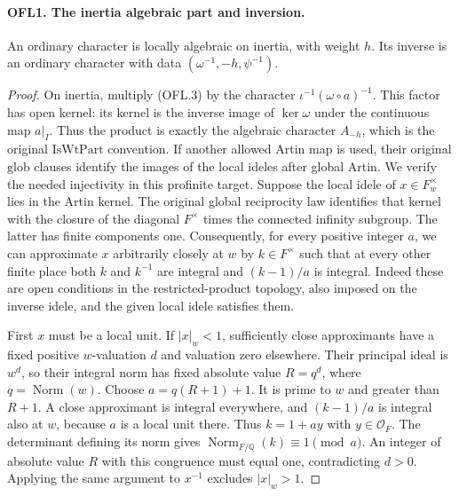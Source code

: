 \documentclass[11pt,a4paper]{article}
\numberwithin{equation}{section}
\theoremstyle{remark}\newtheorem{remark}[theorem]{Remark}
\begin{document}
\paragraph{OFL1. The inertia algebraic part and inversion.}
\label{claim:OFL1}
An ordinary character is locally algebraic on inertia, with weight
\(h\).  Its inverse is an ordinary character with data
\((\omega^{-1},-h,\psi^{-1})\).
\begin{proof}
On inertia, multiply (OFL.3) by the character
\(\iota^{-1}(\omega\circ a)^{-1}\).  This factor has open
kernel: its kernel is the inverse image of \(\ker\omega\)
under the continuous map \(a|_I\).  Thus the product is exactly
the algebraic character \(A_{-h}\), which is the original
\(\mathrm{IsWtPart}\) convention.  If another allowed Artin map
is used, their original \(\mathrm{glob}\) clauses identify the
images of the local ideles after global Artin.  We verify the
needed injectivity in this profinite target.  Suppose the local
idele of \(x\in F_w^\times\) lies in the Artin kernel.  The
original global reciprocity law identifies that kernel with the
closure of the diagonal \(F^\times\) times the connected
infinity subgroup.  The latter has finite components one.
Consequently, for every positive integer \(a\), we can approximate
\(x\) arbitrarily closely at \(w\) by \(k\in F^\times\)
such that at every other finite place both \(k\) and \(k^{-1}\)
are integral and \((k-1)/a\) is integral.  Indeed these are open
conditions in the restricted-product topology, also imposed on
the inverse idele, and the given local idele satisfies them.

First \(x\) must be a local unit.  If \(|x|_w<1\), sufficiently
close approximants have a fixed positive \(w\)-valuation \(d\)
and valuation zero elsewhere.  Their principal ideal is
\(w^d\), so their integral norm has fixed absolute value
\(R=q^d\), where \(q=\operatorname{Norm}(w)\).
Choose \(a=q(R+1)+1\).  It is prime to \(w\) and greater
than \(R+1\).  A close approximant is integral everywhere,
and \((k-1)/a\) is integral also at \(w\), because \(a\)
is a local unit there.  Thus \(k=1+ay\) with \(y\in\mathcal O_F\).
The determinant defining its norm gives
\(\operatorname{Norm}_{F/\mathbb Q}(k)\equiv1\pmod a\).
An integer of absolute value \(R\) with this congruence must
equal one, contradicting \(d>0\).  Applying the same argument
to \(x^{-1}\) excludes \(|x|_w>1\).


\end{proof}
\end{document}
